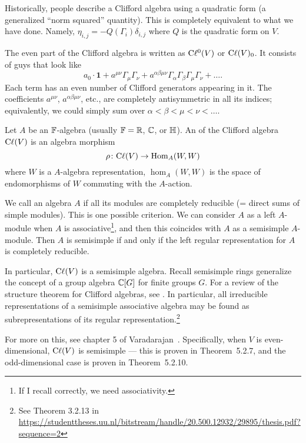 \begin{remark}
Historically, people describe a Clifford algebra using a quadratic form
(a generalized ``norm squared'' quantity). This is completely equivalent
to what we have done. Namely, $\eta_{i,j}=-Q(\Gamma_{i})\delta_{i,j}$ where
$Q$ is the quadratic form on $V$.
\end{remark}

The even part of the Clifford algebra is written as $\mathrm{C}\ell^{0}(V)$ or
$\mathrm{C}\ell(V)_{0}$. It consists of guys that look like
\[ a_{0}\cdot\mathbf{1} + a^{\mu\nu}\Gamma_{\mu}\Gamma_{\nu} + a^{\alpha\beta\mu\nu}\Gamma_{\alpha}\Gamma_{\beta}\Gamma_{\mu}\Gamma_{\nu}+\dots.\]
Each term has an even number of Clifford generators appearing in it. The
coefficients $a^{\mu\nu}$, $a^{\alpha\beta\mu\nu}$, etc., are completely
antisymmetric in all its indices; equivalently, we could simply sum over
$\alpha<\beta<\mu<\nu<\dots$. 

\begin{definition}
Let $A$ be an $\mathbb{F}$-algebra (usually $\mathbb{F}=\mathbb{R}$, $\mathbb{C}$, or $\mathbb{H}$). An
 of the Clifford algebra $\mathrm{C}\ell(V)$ is an algebra morphism
\[ \rho\colon\mathrm{C}\ell(V)\to\operatorname{Hom}_{A}(W, W) \]
where $W$ is a $A$-algebra representation, $\hom_{A}(W, W)$ is the space
of endomorphisms of $W$ commuting with the $A$-action.
\end{definition}

We call an algebra $A$  if all its modules are
completely reducible (= direct sums of simple modules). This is one
possible criterion. We can consider $A$ as a left $A$-module when $A$ is
associative\footnote{If I recall correctly, we need associativity.}, and
then this coincides with $A$ as a semisimple $A$-module. Then $A$ is
semisimple if and only if the left regular representation for $A$ is
completely reducible.

In particular, $\mathrm{C}\ell(V)$ is a semisimple algebra. Recall semisimple rings
generalize the concept of a group algebra $\mathbb{C}[G]$ for finite groups
$G$. For a review of the structure theorem for Clifford algebras, see
. In particular, all irreducible representations of a
semisimple associative algebra may be found as subrepresentations of its
regular representation.\footnote{See Theorem 3.2.13 in \url{https://studenttheses.uu.nl/bitstream/handle/20.500.12932/29895/thesis.pdf?sequence=2}}

For more on this, see chapter 5 of Varadarajan~\cite{Varadarajan:2004yz}.
Specifically, when $V$ is even-dimensional, $\mathrm{C}\ell(V)$ is semisimple ---
this is proven in Theorem~5.2.7, and the odd-dimensional case is proven
in Theorem~5.2.10.

